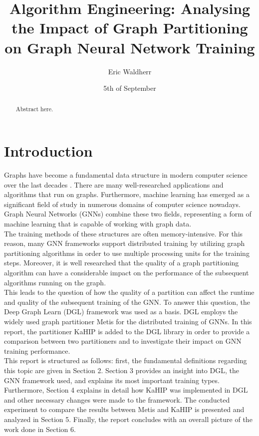 \documentclass[acmsmall,nonacm,screen,review]{acmart}
\title{Algorithm Engineering: Analysing the Impact of Graph Partitioning on Graph Neural Network Training}
\author{Eric Waldherr}
\affiliation{%
  \institution{Heidelberg University}
  \streetaddress{Im Neuenheimer Feld 205}
  \city{Heidelberg}
  \state{Baden-Württemberg}
  \country{Germany}
  \postcode{69120}
}
\date{5th of September}
\begin{document}
\begin{abstract}
Abstract here.
\end{abstract}
\maketitle

\section{Introduction}
Graphs have become a fundamental data structure in modern computer science over the last decades \cite{Junghanns2017}. There are many well-researched applications and algorithms that run on graphs. Furthermore, machine learning has emerged as a significant field of study in numerous domains of computer science nowadays. Graph Neural Networks (GNNs) combine these two fields, representing a form of machine learning that is capable of working with graph data. \\
The training methods of these structures are often memory-intensive. For this reason, many GNN frameworks support distributed training by utilizing graph partitioning algorithms in order to use multiple processing units for the training steps. Moreover, it is well researched that the quality of a graph partitioning algorithm can have a considerable impact on the performance of the subsequent algorithms running on the graph. \\
This leads to the question of how the quality of a partition can affect the runtime and quality of the subsequent training of the GNN. To answer this question, the Deep Graph Learn (DGL) framework \cite{DGL} was used as a basis. DGL employs the widely used graph partitioner Metis \cite{Metis} for the distributed training of GNNs. In this report, the partitioner KaHIP \cite{KaHIP} is added to the DGL library in order to provide a comparison between two partitioners and to investigate their impact on GNN training performance. \\  
This report is structured as follows: first, the fundamental definitions regarding this topic are given in Section 2. Section 3 provides an insight into DGL, the GNN framework used, and explains its most important training types. Furthermore, Section 4 explains in detail how KaHIP was implemented in DGL and other necessary changes were made to the framework. The conducted experiment to compare the results between Metis and KaHIP is presented and analyzed in Section 5. Finally, the report concludes with an overall picture of the work done in Section 6. 
\end{document}
